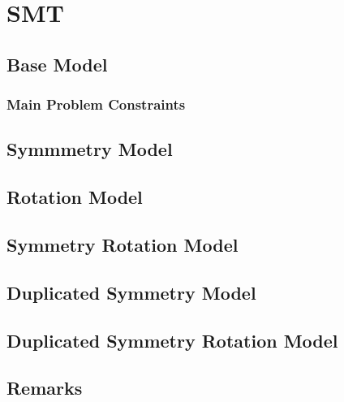 \chapter{SMT}

\section{Base Model}
\subsection{Main Problem Constraints}

\section{Symmmetry Model}
\section{Rotation Model}
\section{Symmetry Rotation Model}
\section{Duplicated Symmetry Model}
\section{Duplicated Symmetry Rotation Model}

\section{Remarks}